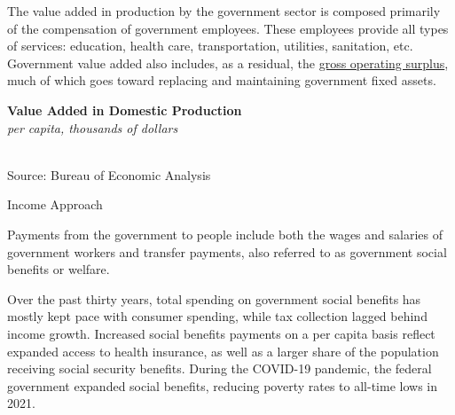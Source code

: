 \documentclass{report}
\makeatletter
\newcommand{\tbllink}[1]{\href{https://raw.githubusercontent.com/bdecon/US-chartbook/master/chartbook/data/#1}{\faTable}}
\newcommand*\short[1]{\expandafter\@gobbletwo\number\numexpr#1\relax}
\newcommand{\stdnode}[3]{\node[below, align=left, shift=({#1,#2})]{#3};}
\newcommand{\shdateaxisticks}{
		date coordinates in=x, axis line style={draw=none},
		xmax={2023-11-01},
		max space between ticks=40,	    
		xtick={{1990-01-01}, {1995-01-01}, {2000-01-01}, 
			{2005-01-01}, {2010-01-01}, {2015-01-01}, {2020-01-01}},
		minor xtick={},
		enlarge y limits={0.06}, enlarge x limits={0.01},
		}
\newcommand{\bbar}[2]{extra #1 ticks = {{#2}}, extra #1 tick labels = ,
		extra #1 tick style = {grid=major, grid style={thick, black!25}},}
\newcommand{\stdline}[4]{\addplot[very thick, no markers, color=#1] 
		table [x=#2, y=#3, col sep=comma] {#4};	}
\newcommand{\rebars}{
		\fill[color=black!10] (axis cs:{2007-12-01},\pgfkeysvalueof{/pgfplots/ymin}) rectangle 
			(axis cs:{2009-07-01}, \pgfkeysvalueof{/pgfplots/ymax});
		\fill[color=black!10] (axis cs:{2001-03-01},\pgfkeysvalueof{/pgfplots/ymin}) rectangle 
			(axis cs:{2001-11-01}, \pgfkeysvalueof{/pgfplots/ymax});
		\fill[color=black!10] (axis cs:{2020-02-01},\pgfkeysvalueof{/pgfplots/ymin}) rectangle 
			(axis cs:{2020-05-01}, \pgfkeysvalueof{/pgfplots/ymax});}
\makeatother
\begin{document}
{\begin{minipage}{0.76\textwidth}
\small The value added in production by the government sector is composed primarily of the compensation of government employees. These employees provide all types of services: education, health care, transportation, utilities, sanitation, etc. Government value added also includes, as a residual, the \href{https://www.bea.gov/help/glossary/gross-operating-surplus}{gross operating surplus}, much of which goes toward replacing and maintaining government fixed assets. 
\end{minipage}
\vspace{2mm}

\begin{minipage}{0.38\textwidth}
\normalsize \textbf{Value Added in Domestic Production}\\
\footnotesize{\textit{per capita, thousands of dollars}}\\
\hspace*{-2mm} \\
\footnotesize{Source: Bureau of Economic Analysis} \hfill \tbllink{gdpva_pc.csv}
\end{minipage} \hspace{6mm}
\begin{minipage}{0.33\textwidth}
\small 
\end{minipage}
\newpage
\begin{minipage}{0.76\textwidth}    
\normalsize Income Approach
\vspace{-1mm}

\small Payments from the government to people include both the wages and salaries of government workers and transfer payments, also referred to as government social benefits or welfare.

Over the past thirty years, total spending on government social benefits has mostly kept pace with consumer spending, while tax collection lagged behind income growth. Increased social benefits payments on a per capita basis reflect expanded access to health insurance, as well as a larger share of the population receiving social security benefits. During the COVID-19 pandemic, the federal government expanded social benefits, reducing poverty rates to all-time lows in 2021. 
\end{minipage}
\vspace{1mm}

}
\end{document}
